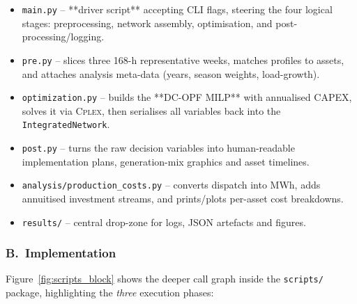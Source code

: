 \begin{itemize}
    \item \texttt{main.py} –\- **driver script** accepting CLI flags, steering the four logical stages:
          preprocessing, network assembly, optimisation, and post-processing/logging.  
    \item \texttt{pre.py} –\- slices three \mbox{168-h} representative weeks, matches
          profiles to assets, and attaches analysis meta-data (years, season weights, load-growth).
    \item \texttt{optimization.py} –\- builds the **DC-OPF MILP** with annualised CAPEX,
          solves it via \textsc{Cplex}, then serialises all variables back into the
          \texttt{IntegratedNetwork}.
    \item \texttt{post.py} –\- turns the raw decision variables into human-readable
          implementation plans, generation-mix graphics and asset timelines.
    \item \texttt{analysis/production\_costs.py} –\- converts dispatch into MWh,
          adds annuitised investment streams, and prints/plots per-asset
          cost breakdowns.
    \item \texttt{results/} –\- central drop-zone for logs, JSON artefacts and figures.
\end{itemize}

\subsubsection*{B.\ Implementation}

Figure~\ref{fig:scripts_block} shows the deeper call graph inside the
\texttt{scripts/} package, highlighting the \emph{three}
execution phases:

